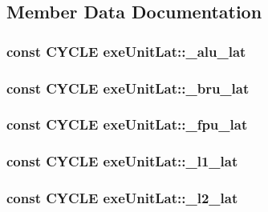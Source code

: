\subsection{Member Data Documentation}
\hypertarget{structexeUnitLat_a1c6fbd51db44097cab33015d4ee9dd81}{
\subsubsection[{\_\-alu\_\-lat}]{\setlength{\rightskip}{0pt plus 5cm}const {\bf CYCLE} {\bf exeUnitLat::\_\-alu\_\-lat}}}
\label{structexeUnitLat_a1c6fbd51db44097cab33015d4ee9dd81}
\hypertarget{structexeUnitLat_a56f987ed90a23321279e330e068262f8}{
\subsubsection[{\_\-bru\_\-lat}]{\setlength{\rightskip}{0pt plus 5cm}const {\bf CYCLE} {\bf exeUnitLat::\_\-bru\_\-lat}}}
\label{structexeUnitLat_a56f987ed90a23321279e330e068262f8}
\hypertarget{structexeUnitLat_a3eaf6d977e10668f9f9641601c2e155d}{
\subsubsection[{\_\-fpu\_\-lat}]{\setlength{\rightskip}{0pt plus 5cm}const {\bf CYCLE} {\bf exeUnitLat::\_\-fpu\_\-lat}}}
\label{structexeUnitLat_a3eaf6d977e10668f9f9641601c2e155d}
\hypertarget{structexeUnitLat_a3c5ce17975afa47ae136e8355e328c3b}{
\subsubsection[{\_\-l1\_\-lat}]{\setlength{\rightskip}{0pt plus 5cm}const {\bf CYCLE} {\bf exeUnitLat::\_\-l1\_\-lat}}}
\label{structexeUnitLat_a3c5ce17975afa47ae136e8355e328c3b}
\hypertarget{structexeUnitLat_a0a5e96d306ef23a2d69c8e97d62b27fd}{
\subsubsection[{\_\-l2\_\-lat}]{\setlength{\rightskip}{0pt plus 5cm}const {\bf CYCLE} {\bf exeUnitLat::\_\-l2\_\-lat}}}
